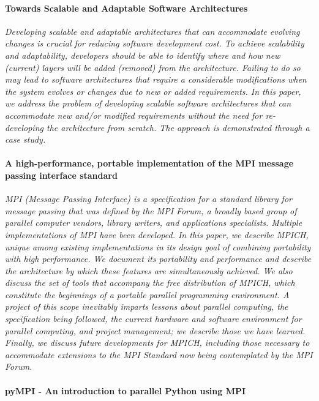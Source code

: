 \documentclass{article}
\begin{document}
{\paragraph{Towards Scalable and Adaptable Software Architectures} \cite{fayad2005towards}

\emph{Developing scalable and adaptable architectures that can accommodate
evolving changes is crucial for reducing software development cost. To achieve
scalability and adaptability, developers should be able to identify where and
how new (current) layers will be added (removed) from the architecture.
Failing to do so may lead to software architectures that require a considerable
modifications when the system evolves or changes due to new or added
requirements. In this paper, we address the problem of developing scalable
software architectures that can accommodate new and/or modified requirements
without the need for re-developing the architecture from scratch. The approach
is demonstrated through a case study.}

\paragraph{A high-performance, portable implementation of the MPI message passing
interface standard} \cite{gropp1996high}

\emph{MPI (Message Passing Interface) is a specification for a standard library
for message passing that was defined by the MPI Forum, a broadly based group of
parallel computer vendors, library writers, and applications specialists.
Multiple implementations of MPI have been developed. In this paper, we describe
MPICH, unique among existing implementations in its design goal of combining
portability with high performance. We document its portability and performance
and describe the architecture by which these features are simultaneously
achieved. We also discuss the set of tools that accompany the free distribution
of MPICH, which constitute the beginnings of a portable parallel programming
environment. A project of this scope inevitably imparts lessons about parallel
computing, the specification being followed, the current hardware and software
environment for parallel computing, and project management; we describe those
we have learned.  Finally, we discuss future developments for MPICH, including
those necessary to accommodate extensions to the MPI Standard now being
contemplated by the MPI Forum.}

\paragraph{pyMPI - An introduction to parallel Python using MPI}
\cite{miller2002pympi}

}
\end{document}
